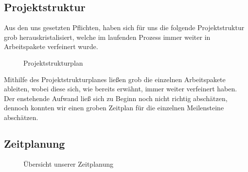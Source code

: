 \newpage

\subsection{Projektstruktur} \label{Projektstruktur}

Aus den uns gesetzten Pflichten, haben sich für uns die folgende Projektstruktur grob herauskristalisiert, welche im laufenden Prozess immer weiter in Arbeitspakete verfeinert wurde.


\begin{center}
	\begin{figure}[h]
		 \noindent{}
		 \caption[Projektstrukturplan]{Projektstrukturplan} 

	\end{figure}
\end{center}

Mithilfe des Projektstrukturplanes ließen grob die einzelnen Arbeitspakete ableiten, wobei diese sich, wie bereits erwähnt, immer weiter verfeinert haben. Der enstehende Aufwand ließ sich zu Beginn noch nicht richtig abschätzen, dennoch konnten wir einen groben Zeitplan für die einzelnen Meilensteine abschätzen.

\newpage

\subsection{Zeitplanung} \label{Zeitplanung}

\begin{center}
	\begin{figure}[h]

	 \noindent{}
	 \caption[Übersicht unserer Zeitplanung]{Übersicht unserer Zeitplanung}
	 \label{fig:zeitplanung}
	\end{figure}
\end{center}

